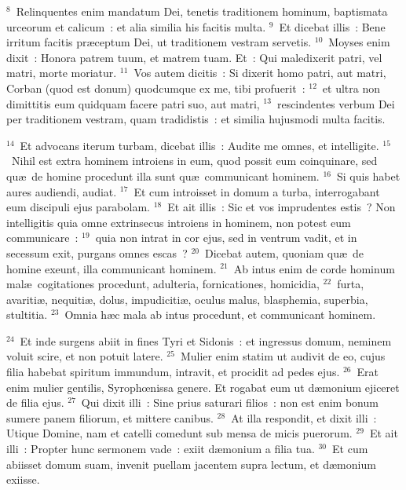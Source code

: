 ${}^{8}$~Relinquentes enim mandatum Dei, tenetis traditionem hominum, baptismata urceorum et calicum~: et alia similia his facitis multa.
${}^{9}$~Et dicebat illis~: Bene irritum facitis pr\ae ceptum Dei, ut traditionem vestram servetis.
${}^{10}$~Moyses enim dixit~: Honora patrem tuum, et matrem tuam. Et~: Qui maledixerit patri, vel matri, morte moriatur.
${}^{11}$~Vos autem dicitis~: Si dixerit homo patri, aut matri, Corban (quod est donum) quodcumque ex me, tibi profuerit~:
${}^{12}$~et ultra non dimittitis eum quidquam facere patri suo, aut matri,
${}^{13}$~rescindentes verbum Dei per traditionem vestram, quam tradidistis~: et similia hujusmodi multa facitis.


${}^{14}$~Et advocans iterum turbam, dicebat illis~: Audite me omnes, et intelligite.
${}^{15}$~Nihil est extra hominem introiens in eum, quod possit eum coinquinare, sed qu\ae\ de homine procedunt illa sunt qu\ae\ communicant hominem.
${}^{16}$~Si quis habet aures audiendi, audiat.
${}^{17}$~Et cum introisset in domum a turba, interrogabant eum discipuli ejus parabolam.
${}^{18}$~Et ait illis~: Sic et vos imprudentes estis~? Non intelligitis quia omne extrinsecus introiens in hominem, non potest eum communicare~:
${}^{19}$~quia non intrat in cor ejus, sed in ventrum vadit, et in secessum exit, purgans omnes escas~?
${}^{20}$~Dicebat autem, quoniam qu\ae\ de homine exeunt, illa communicant hominem.
${}^{21}$~Ab intus enim de corde hominum mal\ae\ cogitationes procedunt, adulteria, fornicationes, homicidia,
${}^{22}$~furta, avariti\ae , nequiti\ae , dolus, impudiciti\ae , oculus malus, blasphemia, superbia, stultitia.
${}^{23}$~Omnia h\ae c mala ab intus procedunt, et communicant hominem.


${}^{24}$~Et inde surgens abiit in fines Tyri et Sidonis~: et ingressus domum, neminem voluit scire, et non potuit latere.
${}^{25}$~Mulier enim statim ut audivit de eo, cujus filia habebat spiritum immundum, intravit, et procidit ad pedes ejus.
${}^{26}$~Erat enim mulier gentilis, Syrophœnissa genere. Et rogabat eum ut d\ae monium ejiceret de filia ejus.
${}^{27}$~Qui dixit illi~: Sine prius saturari filios~: non est enim bonum sumere panem filiorum, et mittere canibus.
${}^{28}$~At illa respondit, et dixit illi~: Utique Domine, nam et catelli comedunt sub mensa de micis puerorum.
${}^{29}$~Et ait illi~: Propter hunc sermonem vade~: exiit d\ae monium a filia tua.
${}^{30}$~Et cum abiisset domum suam, invenit puellam jacentem supra lectum, et d\ae monium exiisse.



